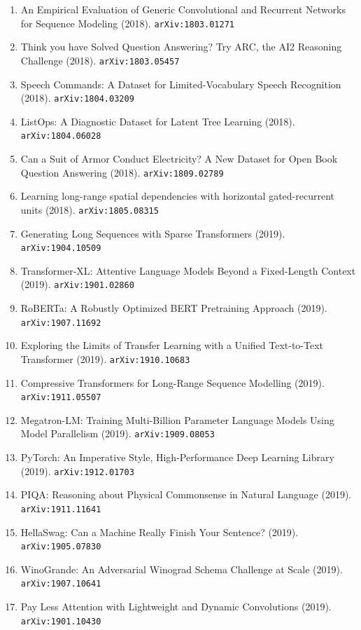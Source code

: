 \documentclass[11pt]{article}
\begin{document}
\begin{enumerate}
  Understanding (2018). \texttt{arXiv:1804.07461}
  \item An Empirical Evaluation of Generic Convolutional and Recurrent Networks
  for Sequence Modeling (2018). \texttt{arXiv:1803.01271}
  \item Think you have Solved Question Answering? Try ARC, the AI2 Reasoning
  Challenge (2018). \texttt{arXiv:1803.05457}
  \item Speech Commands: A Dataset for Limited-Vocabulary Speech Recognition (2018). \texttt{arXiv:1804.03209}
  \item ListOps: A Diagnostic Dataset for Latent Tree Learning (2018). \texttt{arXiv:1804.06028}
  \item Can a Suit of Armor Conduct Electricity? A New Dataset for Open Book
  Question Answering (2018). \texttt{arXiv:1809.02789}
  \item Learning long-range spatial dependencies with horizontal gated-recurrent
  units (2018). \texttt{arXiv:1805.08315}
  \item Generating Long Sequences with Sparse Transformers (2019). \texttt{arXiv:1904.10509}
  \item Transformer-XL: Attentive Language Models Beyond a Fixed-Length Context (2019). \texttt{arXiv:1901.02860}
  \item RoBERTa: A Robustly Optimized BERT Pretraining Approach (2019). \texttt{arXiv:1907.11692}
  \item Exploring the Limits of Transfer Learning with a Unified Text-to-Text
  Transformer (2019). \texttt{arXiv:1910.10683}
  \item Compressive Transformers for Long-Range Sequence Modelling (2019). \texttt{arXiv:1911.05507}
  \item Megatron-LM: Training Multi-Billion Parameter Language Models Using
  Model Parallelism (2019). \texttt{arXiv:1909.08053}
  \item PyTorch: An Imperative Style, High-Performance Deep Learning Library (2019). \texttt{arXiv:1912.01703}
  \item PIQA: Reasoning about Physical Commonsense in Natural Language (2019). \texttt{arXiv:1911.11641}
  \item HellaSwag: Can a Machine Really Finish Your Sentence? (2019). \texttt{arXiv:1905.07830}
  \item WinoGrande: An Adversarial Winograd Schema Challenge at Scale (2019). \texttt{arXiv:1907.10641}
  \item Pay Less Attention with Lightweight and Dynamic Convolutions (2019). \texttt{arXiv:1901.10430}

\end{enumerate}
\end{document}
